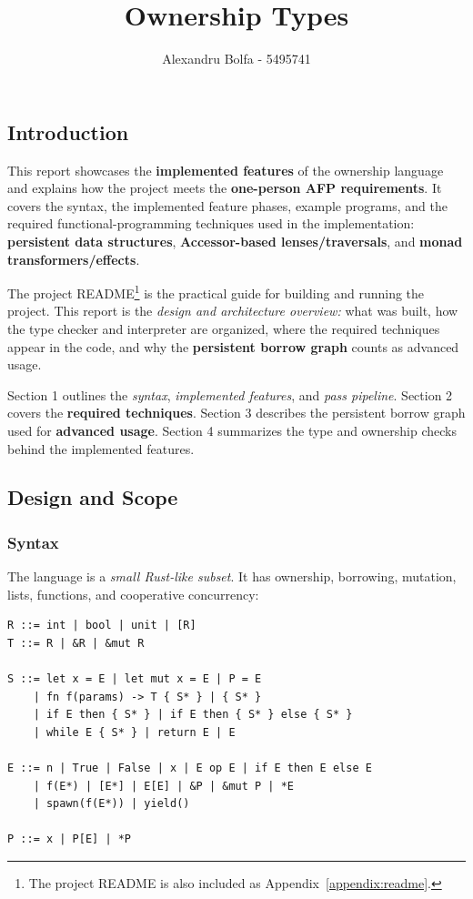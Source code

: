 \documentclass[a4paper]{article}
\title{\textbf{Ownership Types}\\}
\author{Alexandru Bolfa - 5495741}
\begin{document}
\maketitle

\subsection*{Introduction}

This report showcases the \textbf{implemented features} of the ownership
language and explains how the project meets the \textbf{one-person AFP
requirements}. It covers the syntax, the implemented feature phases, example
programs, and the required functional-programming techniques used in the
implementation: \textbf{persistent data structures}, \textbf{Accessor-based
lenses/traversals}, and \textbf{monad transformers/effects}.

The project README\footnote{The project README is also included as
Appendix~\ref{appendix:readme}.} is the practical guide for building and running
the project. This report is the \emph{design and architecture overview:} what
was built, how the type checker and interpreter are organized, where the
required techniques appear in the code, and why the \textbf{persistent borrow
graph} counts as advanced usage.

Section 1 outlines the \emph{syntax}, \emph{implemented features}, and
\emph{pass pipeline}. Section 2 covers the \textbf{required techniques}. Section
3 describes the persistent borrow graph used for \textbf{advanced usage}.
Section 4 summarizes the type and ownership checks behind the implemented
features.

\subsection{Design and Scope}

\subsubsection*{Syntax}

The language is a \emph{small Rust-like subset}. It has ownership, borrowing,
mutation, lists, functions, and cooperative concurrency:

\begin{lstlisting}
R ::= int | bool | unit | [R]
T ::= R | &R | &mut R

S ::= let x = E | let mut x = E | P = E
    | fn f(params) -> T { S* } | { S* }
    | if E then { S* } | if E then { S* } else { S* }
    | while E { S* } | return E | E

E ::= n | True | False | x | E op E | if E then E else E
    | f(E*) | [E*] | E[E] | &P | &mut P | *E
    | spawn(f(E*)) | yield()

P ::= x | P[E] | *P
\end{lstlisting}
\end{document}
